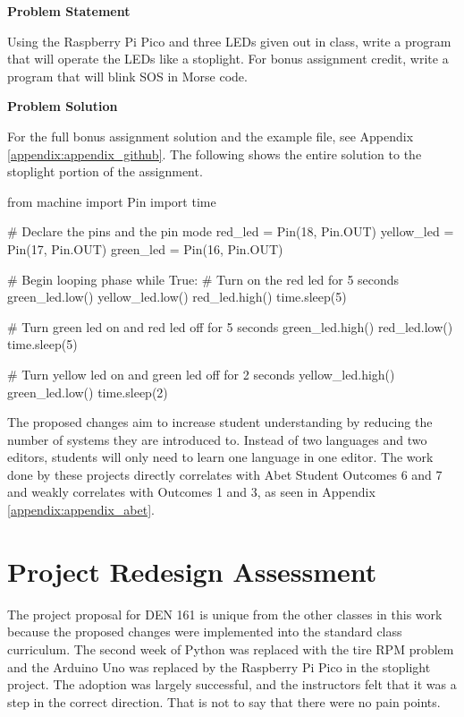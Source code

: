 \label{engg_prob_solve_assignment_3}

\begin{tcolorbox}[breakable, enhanced jigsaw, title=DEN 161: Assignment \ref{engg_prob_solve_assignment_3}, 
    colframe=ksu-purple, colback=ksu-gray]

    \textbf{Problem Statement}

    Using the Raspberry Pi Pico and three LEDs given out in class, write a program that will operate
    the LEDs like a stoplight. For bonus assignment credit, write a program that will blink SOS in Morse code.
    
    \tcblower
    \textbf{Problem Solution}

    For the full bonus assignment solution and the example file, see Appendix \ref{appendix:appendix_github}. 
    The following shows the entire solution to the stoplight portion of the assignment.

\begin{python}
from machine import Pin
import time

# Declare the pins and the pin mode
red_led = Pin(18, Pin.OUT)
yellow_led = Pin(17, Pin.OUT)
green_led = Pin(16, Pin.OUT)

# Begin looping phase
while True:
    # Turn on the red led for 5 seconds
    green_led.low()
    yellow_led.low()
    red_led.high()
    time.sleep(5)

    # Turn green led on and red led off for 5 seconds
    green_led.high()
    red_led.low()
    time.sleep(5)

    # Turn yellow led on and green led off for 2 seconds
    yellow_led.high()
    green_led.low()
    time.sleep(2)
    \end{python}
\end{tcolorbox}


The proposed changes aim to increase student understanding by reducing the number of systems they are introduced 
to. Instead of two languages and two editors, students will only need to learn one language in one editor. The 
work done by these projects directly correlates with Abet Student Outcomes 6 and 7 and weakly correlates with 
Outcomes 1 and 3, as seen in Appendix \ref{appendix:appendix_abet}.

\section{Project Redesign Assessment}

The project proposal for DEN 161 is unique from the other classes in this work because the proposed changes were
implemented into the standard class curriculum. The second week of Python was replaced with the tire RPM problem
and the Arduino Uno was replaced by the Raspberry Pi Pico in the stoplight project. The adoption was largely 
successful, and the instructors felt that it was a step in the correct direction. That is not to say that there
were no pain points.

